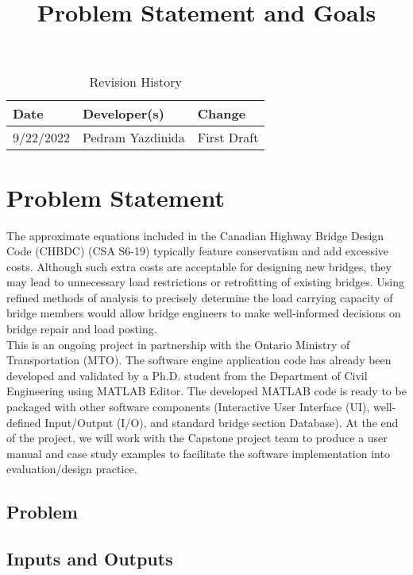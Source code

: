 \documentclass{article}
\title{Problem Statement and Goals\\\progname}
\author{\authname}
\date{}
\begin{document}
\maketitle

\begin{table}[hp]
\caption{Revision History} \label{TblRevisionHistory}
\begin{tabularx}{\textwidth}{llX}
\toprule
\textbf{Date} & \textbf{Developer(s)} & \textbf{Change}\\
\midrule
9/22/2022 & Pedram Yazdinida & First Draft\\

\bottomrule
\end{tabularx}
\end{table}

\section{Problem Statement}

The approximate equations included in the Canadian Highway Bridge Design Code (CHBDC) (CSA S6-19) typically feature conservatism and add excessive costs. Although such extra costs are acceptable for designing new bridges, they may lead to unnecessary load restrictions or retrofitting of existing bridges. Using refined methods of analysis to precisely determine the load carrying capacity of bridge members would allow bridge engineers to make well-informed decisions on bridge repair and load posting.\\

This is an ongoing project in partnership with the Ontario Ministry of Transportation (MTO). The software engine application code has already been developed and validated by a Ph.D. student from the Department of Civil Engineering using MATLAB Editor. The developed MATLAB code is ready to be packaged with other software components (Interactive User Interface (UI), well-defined Input/Output (I/O), and standard bridge section Database). At the end of the project, we will work with the Capstone project team to produce a user manual and case study examples to facilitate the software implementation into evaluation/design practice.

\subsection{Problem}

\subsection{Inputs and Outputs}
\end{document}
